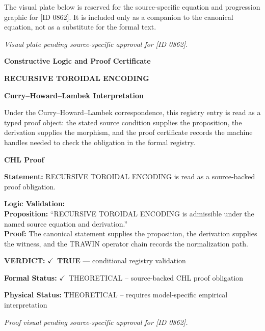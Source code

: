 \begingroup\footnotesize\sloppy
The visual plate below is reserved for the source-specific equation and progression graphic for [ID 0862]. It is included only as a companion to the canonical equation, not as a substitute for the formal text.
\par\endgroup
\begingroup\footnotesize\itshape
Visual plate pending source-specific approval for [ID 0862].
\par\endgroup

\clearpage
\begingroup\tzpsupportsetup
\noindent\textbf{\fontsize{10.8pt}{12.8pt}\selectfont [ID 0862] Constructive Logic and Proof Certificate}\par
\noindent\textbf{\fontsize{10pt}{12pt}\selectfont RECURSIVE TOROIDAL ENCODING}\par
\vspace{0.45em}
\begingroup
\footnotesize
\setlength{\parskip}{0.22em}
\setlength{\parindent}{0pt}
\noindent\textbf{Curry--Howard--Lambek Interpretation}\par
Under the Curry--Howard--Lambek correspondence, this registry entry is read as a typed proof
object: the stated source condition supplies the proposition, the derivation supplies the
morphism, and the proof certificate records the machine handles needed to check the obligation
in the formal registry.

\vspace{0.45em}
\noindent\textbf{CHL Proof}\par
\textbf{Statement:} RECURSIVE TOROIDAL ENCODING is read as a source-backed proof obligation.

\textbf{Logic Validation:}\\
\textbf{Proposition:} ``RECURSIVE TOROIDAL ENCODING is admissible under the named source equation and derivation.''\\
\textbf{Proof:} The canonical statement supplies the proposition, the derivation supplies the witness, and the TRAWIN operator chain records the normalization path.

\textbf{VERDICT:} \ensuremath{\checkmark}\ \textbf{TRUE} --- conditional registry validation

\textbf{Formal Status:} \ensuremath{\checkmark}\ THEORETICAL -- source-backed CHL proof obligation

\textbf{Physical Status:} THEORETICAL -- requires model-specific empirical interpretation
\par\vspace{0.45em}
\par
\vfill
\begingroup\footnotesize\itshape
Proof visual pending source-specific approval for [ID 0862].
\par\endgroup
\vfill
\endgroup
\endgroup
